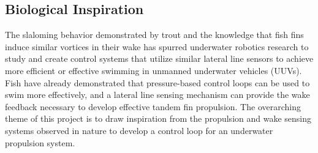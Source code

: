 \subsection{Biological Inspiration}
    
    The slaloming behavior demonstrated by trout and the knowledge that fish fins induce similar vortices in their wake has spurred underwater robotics research to study and create control systems that utilize similar lateral line sensors to achieve more efficient or effective swimming in unmanned underwater vehicles (UUVs). Fish have already demonstrated that pressure-based control loops can be used to swim more effectively, and a lateral line sensing mechanism can provide the wake feedback necessary to develop effective tandem fin propulsion. The overarching theme of this project is to draw inspiration from the propulsion and wake sensing systems observed in nature to develop a control loop for an underwater propulsion system.